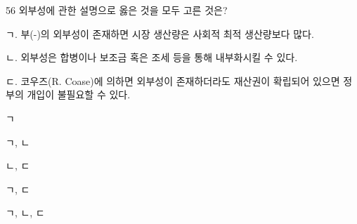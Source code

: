 \begin{question}{56}
외부성에 관한 설명으로 옳은 것을 모두 고른 것은?
\begin{framedtext}
ㄱ. 부(-)의 외부성이 존재하면 시장 생산량은 사회적 최적 생산량보다 많다. \par
ㄴ. 외부성은 합병이나 보조금 혹은 조세 등을 통해 내부화시킬 수 있다. \par
ㄷ. 코우즈(R. Coase)에 의하면 외부성이 존재하더라도 재산권이 확립되어 있으면 정부의 개입이 불필요할 수 있다.
\end{framedtext}
\begin{choices}
  \item ㄱ
  \item ㄱ, ㄴ
  \item ㄴ, ㄷ
  \item ㄱ, ㄷ
  \item ㄱ, ㄴ, ㄷ
\end{choices}
\end{question}
